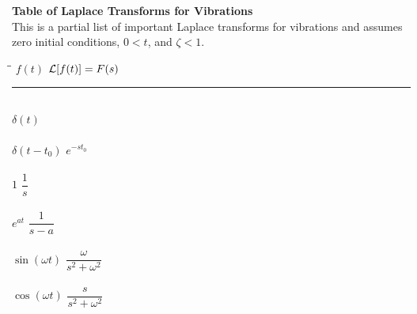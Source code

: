 \documentclass[12pt,letter]{article}
\begin{document}
			
\pagebreak			
			\pagestyle{empty}
			\vspace{-25ex}
			\begin{center}
			{\large{}\textbf{Table of Laplace Transforms for Vibrations}} \\
			\normalsize{} This is a partial list of important Laplace transforms for vibrations and assumes \\ zero initial conditions, $0 < t$, and $\zeta < 1$.
			\end{center}
			
			\vspace{0ex}
			{\small
			\renewcommand{\arraystretch}{1.5}
			\begin{multicols}{2}
			\begin{center}
			\begin{tabbing}
			\hspace*{1.5 in}\=\hspace{1.5in}\= \kill
				$f(t)$ \> $\mathcal{L}{\left[f(t)\right]}=F(s)$ \> \\ \noindent\rule{8.0cm}{0.4pt} \\
				$\delta(t)$	 \> \LTNUM \\ \\
				$\delta(t-t_0)$ \> $e^{-st_0}$ \>\LTNUM \\ \\
				$1$       			 \> $\dfrac{1}{s}$           \>\LTNUM \\ \\
				$e^{at}$ 	\> $\dfrac{1}{s-a}$ 	\>\LTNUM \\ \\
				$\sin (\omega t) $ 	\> $\dfrac{\omega}{s^2+\omega^2}$ \>\LTNUM \\ \\
				$\cos (\omega t) $ 	\> $\dfrac{s}{s^2+\omega^2}$ \>\LTNUM \\ \\
				

\end{tabbing}
\end{center}
\end{multicols}}
\end{document}
